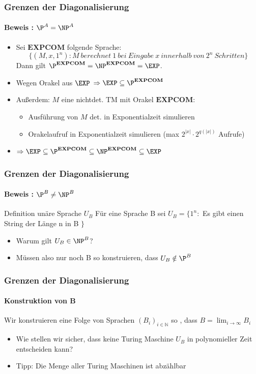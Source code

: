 \begin{frame}
	\frametitle{Grenzen der Diagonalisierung}
	\framesubtitle{Beweis : ${\P}^A = {\NP}^A$ }
	\begin{itemize} [<+->]
		\item Sei $\mathbf{EXPCOM}$ folgende Sprache: \[\{(M,x,1^n) : M \ berechnet \ 1 \ bei \ Eingabe \ x \ innerhalb \ von \ 2^n \ Schritten  \}
		 \] 
			Dann gilt ${\P}^{\mathbf{EXPCOM}} = {\NP}^{\mathbf{EXPCOM}} = \EXP$.
			\item Wegen Orakel aus $\EXP$  $ \Rightarrow \EXP \subseteq {\P}^{\mathbf{EXPCOM}} $
			\item Außerdem: $M$ eine nichtdet. TM mit Orakel $\mathbf{EXPCOM}$: 
				\begin{itemize}[<+->]
					\item Ausführung von $M$ det. in Exponentialzeit simulieren
					\item Orakelaufruf in Exponentialzeit simulieren (max $2^{|x|} \cdot 2^{q(|x|)}$ Aufrufe)	
				\end{itemize}
			\item $\Rightarrow \EXP \subseteq{\P}^{\mathbf{EXPCOM}} \subseteq {\NP}^{\mathbf{EXPCOM}} \subseteq \EXP$
			
	\end{itemize}
\end{frame}

\begin{frame}
	\frametitle{Grenzen der Diagonalisierung}
	\framesubtitle{Beweis : ${\P}^B \neq {\NP}^B$}
	\begin{KITinfoblock}{Definition unäre Sprache $U_B$}
		Für eine Sprache B sei $U_B = \lbrace 1^n :$ Es gibt einen String
		der L\"ange n in B $\rbrace $
	\end{KITinfoblock}	
	\pause
	
	\begin{itemize}[<+->]
		\item Warum gilt $U_B \in {\NP}^B$?
		\item M\"ussen also nur noch B so konstruieren, dass $U_B \notin {\P}^B$
	\end{itemize}
\end{frame}

\begin{frame}
	\frametitle{Grenzen der Diagonalisierung}
	\framesubtitle{Konstruktion von B}
	Wir konstruieren eine Folge von Sprachen $(B_i)_{i \in \mathbb{N}}$ so , dass 
	$B = \lim_{i \to \infty} B_i$	
	\begin{itemize}[<+->]
		\item Wie stellen wir sicher, dass keine Turing Maschine $U_B$
			in polynomieller Zeit entscheiden kann?
		\item Tipp: Die Menge aller Turing Maschinen ist abzählbar
	\end{itemize}
\end{frame}

